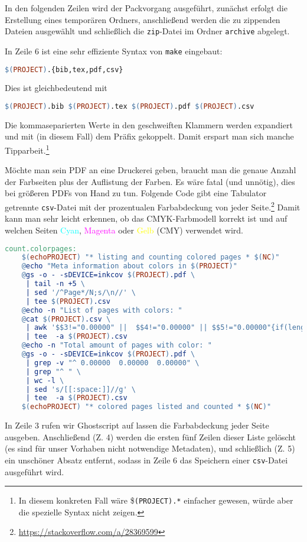 \documentclass[ngerman]{dtk}
\begin{document}
In den folgenden Zeilen wird der Packvorgang ausgeführt,
zunächst erfolgt die Erstellung eines temporären Ordners,
anschließend werden die zu zippenden Dateien ausgewählt
 und schließlich die \texttt{zip}-Datei im Ordner \texttt{archive} abgelegt.

In Zeile 6 ist eine sehr effiziente Syntax von \texttt{make} eingebaut:
\begin{lstlisting}[style=noNumber,language=make]
$(PROJECT).{bib,tex,pdf,csv}
\end{lstlisting}
Dies ist gleichbedeutend mit
\begin{lstlisting}[style=noNumber,language=make]
$(PROJECT).bib $(PROJECT).tex $(PROJECT).pdf $(PROJECT).csv
\end{lstlisting}
Die kommaseparierten Werte in den geschweiften Klammern
werden expandiert und mit (in diesem Fall) dem Präfix  gekoppelt.
Damit erspart man sich manche Tipparbeit.\footnote{In diesem konkreten Fall wäre \$\texttt{(PROJECT).*} einfacher gewesen, würde aber die spezielle Syntax nicht zeigen.}

Möchte man sein PDF an eine Druckerei geben,
braucht man die genaue Anzahl der Farbseiten plus der Auflistung der Farben.
Es wäre fatal (und unnötig), dies bei größeren PDFs von Hand zu tun.
Folgende Code gibt eine Tabulator getrennte \texttt{csv}-Datei
mit der prozentualen Farbabdeckung von jeder Seite.\footnote{\url{https://stackoverflow.com/a/28369599}}
Damit kann man sehr leicht erkennen,
ob das CMYK-Farbmodell korrekt ist und auf welchen Seiten
\textcolor{cyan}{Cyan},
\textcolor{magenta}{Magenta} oder
\textcolor{yellow}{Gelb} (CMY) verwendet wird.
\begin{lstlisting}[style=number,language=make]
count.colorpages:
	$(echoPROJECT) "* listing and counting colored pages * $(NC)"
	@echo "Meta information about colors in $(PROJECT)"
	@gs -o - -sDEVICE=inkcov $(PROJECT).pdf \
	 | tail -n +5 \
	 | sed '/^Page*/N;s/\n//' \
	 | tee $(PROJECT).csv
	@echo -n "List of pages with colors: "
	@cat $(PROJECT).csv \
	 | awk '$$3!="0.00000" ||  $$4!="0.00000" || $$5!="0.00000"{if(length(colored))colored=colored","$$2;else colored=$$2} END{print colored}' \
	 | tee  -a $(PROJECT).csv
	@echo -n "Total amount of pages with color: "
	@gs -o - -sDEVICE=inkcov $(PROJECT).pdf \
	 | grep -v "^ 0.00000  0.00000  0.00000" \
	 | grep "^ " \
	 | wc -l \
	 | sed 's/[[:space:]]//g' \
	 | tee  -a $(PROJECT).csv
	$(echoPROJECT) "* colored pages listed and counted * $(NC)"
\end{lstlisting}
In Zeile 3 rufen wir Ghostscript auf lassen die Farbabdeckung jeder Seite ausgeben.
Anschließend (Z. 4) werden die ersten fünf Zeilen dieser Liste gelöscht
(es sind für unser Vorhaben nicht notwendige Metadaten),
und schließlich (Z. 5) ein unschöner Absatz entfernt,
sodass in Zeile 6 das Speichern einer \texttt{csv}-Datei ausgeführt wird.
\end{document}
